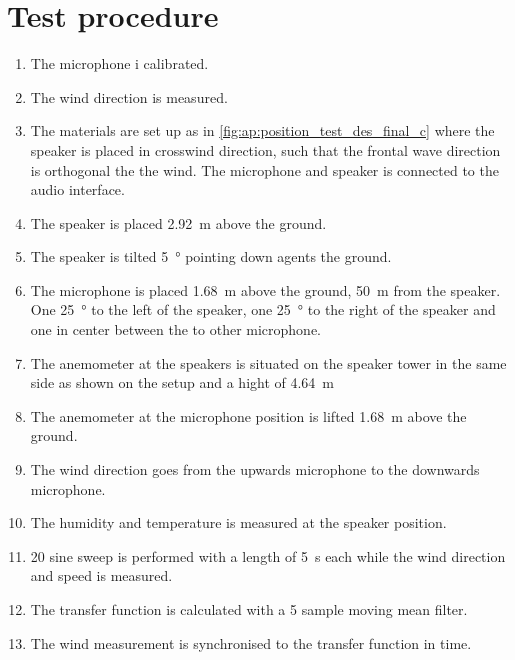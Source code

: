 


\section*{Test procedure}


\begin{enumerate}
\item The microphone i calibrated.
\item The wind direction is measured.
\item The materials are set up as in \autoref{fig:ap:position_test_des_final_c} where the speaker is placed in crosswind direction, such that the frontal wave direction is orthogonal the the wind. The microphone and speaker is connected to the audio interface.
\item The speaker is placed \SI{2.92}{\meter} above the ground.
\item The speaker is tilted \SI{5}{\degree} pointing down agents the ground.
\item The microphone is placed \SI{1.68}{\meter} above the ground, \SI{50}{\meter} from the speaker. One \SI{25}{\degree} to the left of the speaker, one \SI{25}{\degree} to the right of the speaker and one in center between the to other microphone.
\item The anemometer at the speakers is situated on the speaker tower in the same side as shown on the setup and a hight of \SI{4.64}{\meter}
\item The anemometer at the microphone position is lifted \SI{1.68}{\meter} above the ground.
\item The wind direction goes from the upwards microphone to the downwards microphone.
\item The humidity and temperature is measured at the speaker position.
\item 20 sine sweep is performed with a length of \SI{5}{\second} each while the wind direction and speed is measured.
\item The transfer function is calculated with a 5 sample moving mean filter.
\item The wind measurement is synchronised to the transfer function in time. 

\end{enumerate}

